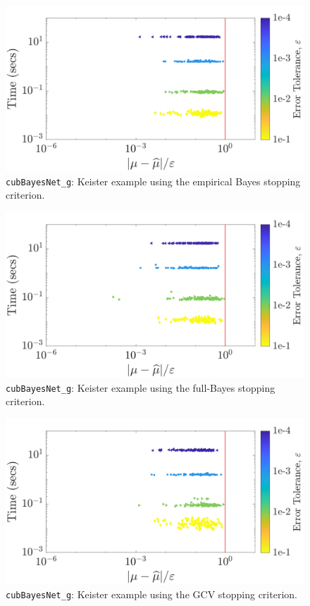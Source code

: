 \documentclass{iitthesis}          %
\newcommand{\code}[1]{\texttt{#1}}
\begin{document}
{{{{{{\begin{figure}
	\centering
	\includegraphics[width=0.95\linewidth]{"Sobol/Sobol_Keister_guaranteed_time_MLE__d4_r1_2019-Jun-17"}
	\caption[Sobol: Keister guaranteed: MLE]{\code{cubBayesNet\_g}: Keister example using the empirical Bayes stopping criterion.}
	\label{fig:Sobol-keister-guaranteed-MLE}
\end{figure}
\begin{figure}
	\centering
	\includegraphics[width=0.95\linewidth]{"Sobol/Sobol_Keister_guaranteed_time_full__d4_r1_2019-Jun-17"}
	\caption[Sobol: Keister guaranteed: Full Bayes]{\code{cubBayesNet\_g}: Keister example using the full-Bayes stopping criterion.}
	\label{fig:Sobol-keister-guaranteed-FB}
\end{figure}
\begin{figure}
	\centering
	\includegraphics[width=0.95\linewidth]{"Sobol/Sobol_Keister_guaranteed_time_GCV__d4_r1_2019-Jun-17"}
	\caption[Sobol: Keister guaranteed: GCV]{\code{cubBayesNet\_g}: Keister example using the GCV stopping criterion.}
	\label{fig:Sobol-keister-guaranteed-GCV}
\end{figure}







}}}}}}
\end{document}
